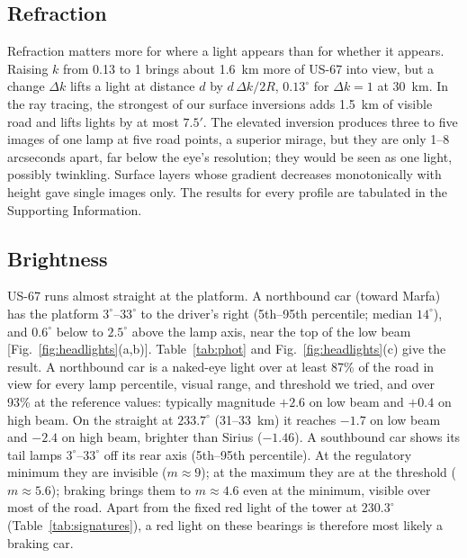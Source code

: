 \documentclass[aip,jap,amsmath,amssymb,reprint,floatfix]{revtex4-2}
\begin{document}
\subsection{Refraction}

Refraction matters more for where a light appears than for whether it appears. Raising $k$ from 0.13 to 1 brings about 1.6~km more of US-67 into view, but a change $\Delta k$ lifts a light at distance $d$ by $d\,\Delta k/2R$, $0.13^\circ$ for $\Delta k=1$ at 30~km. In the ray tracing, the strongest of our surface inversions adds 1.5~km of visible road and lifts lights by at most $7.5'$. The elevated inversion produces three to five images of one lamp at five road points, a superior mirage, but they are only 1--8 arcseconds apart, far below the eye's resolution; they would be seen as one light, possibly twinkling. Surface layers whose gradient decreases monotonically with height gave single images only. The results for every profile are tabulated in the Supporting Information.\cite{SM}

\subsection{Brightness}

US-67 runs almost straight at the platform. A northbound car (toward Marfa) has the platform $3^\circ$--$33^\circ$ to the driver's right (5th--95th percentile; median $14^\circ$), and $0.6^\circ$ below to $2.5^\circ$ above the lamp axis, near the top of the low beam [Fig.~\ref{fig:headlights}(a,b)]. Table~\ref{tab:phot} and Fig.~\ref{fig:headlights}(c) give the result. A northbound car is a naked-eye light over at least 87\% of the road in view for every lamp percentile, visual range, and threshold we tried, and over 93\% at the reference values: typically magnitude $+2.6$ on low beam and $+0.4$ on high beam. On the straight at $233.7^\circ$ (31--33~km) it reaches $-1.7$ on low beam and $-2.4$ on high beam, brighter than Sirius ($-1.46$). A southbound car shows its tail lamps $3^\circ$--$33^\circ$ off its rear axis (5th--95th percentile). At the regulatory minimum they are invisible ($m\approx9$); at the maximum they are at the threshold ($m\approx5.6$); braking brings them to $m\approx4.6$ even at the minimum, visible over most of the road. Apart from the fixed red light of the tower at $230.3^\circ$ (Table~\ref{tab:signatures}), a red light on these bearings is therefore most likely a braking car.
\end{document}
